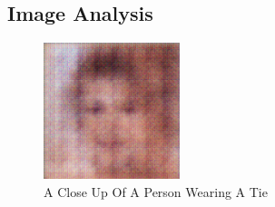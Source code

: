 \documentclass{article}%
\begin{document}
%
\subsection{Image Analysis}%
\label{subsec:ImageAnalysis}%


\begin{figure}[h!]%
\centering%
\includegraphics[width=150px]{500_fake_images/samples_5_165.png}%
\caption{A Close Up Of A Person Wearing A Tie}%
\end{figure}

%
\end{document}

